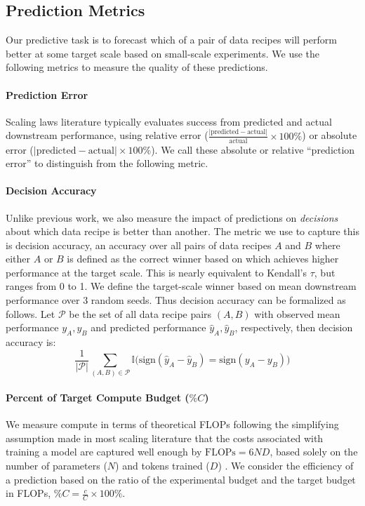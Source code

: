 \documentclass{article}
\theoremstyle{plain}
\theoremstyle{definition}
\theoremstyle{remark}
\newcommand{\numTargetSeeds}{3}
\newcommand{\percentTargetCompute}{$\%C$}
\newcommand{\twoClass}{decision accuracy}
\newcommand{\predictionError}{prediction error}
\begin{document}
\subsection{Prediction Metrics}
\label{sec:pred_metrics}
Our predictive task is to forecast which of a pair of data recipes will perform better at some target scale based on small-scale experiments. We use the following metrics to measure the quality of these predictions.

\paragraph{Prediction Error} Scaling laws literature \citep{bhagia2024establishingtaskscalinglaws, gadre2024languagemodelsscalereliably} typically evaluates success from predicted and actual downstream performance, using relative error ($\frac{\lvert \text{predicted} - \text{actual} \rvert}{\text{actual}} \times 100\%$) or absolute error ($\lvert \text{predicted} - \text{actual} \rvert\times 100\%$). We call these absolute or relative ``\predictionError{}'' to distinguish from the following metric.

\label{sec:2-class}
\paragraph{Decision Accuracy} 
Unlike previous work, we also measure the impact of predictions on \textit{decisions} about which data recipe is better than another. The metric we use to capture this is \twoClass{}, an accuracy over all pairs of data recipes $A$ and $B$ where either $A$ or $B$ is defined as the correct winner based on which achieves higher performance at the target scale. This is nearly equivalent to Kendall's $\tau$, but ranges from 0 to 1. We define the target-scale winner based on mean downstream performance over \numTargetSeeds{} random seeds.
Thus \twoClass{}  can be formalized as follows.  Let   \(\mathcal{P}\) be the set of all data recipe pairs \((A, B)\) with observed mean performance \(y_A, y_B\) and predicted performance \(\hat{y}_A, \hat{y}_B\), respectively, then \twoClass{} is:
\begin{equation}
\textstyle \frac{1}{\lvert \mathcal{P}\rvert} \sum_{(A, B) \in \mathcal{P}} \mathbb{I}\big(\text{sign}(\hat{y}_A - \hat{y}_B) = \text{sign}(y_A - y_B)\big)
\end{equation} 

\paragraph{Percent of Target Compute Budget (\percentTargetCompute{})} We measure compute in terms of theoretical FLOPs following the simplifying assumption made in most scaling literature that the costs associated with training a model are captured well enough by $\text{FLOPs}=6ND$, based solely on the number of parameters ($N$) and tokens trained ($D$) \citep{kaplan2020scalinglawsneurallanguage}. We consider the efficiency of a prediction based on the ratio of the experimental budget and the target budget in FLOPs, $\text{\percentTargetCompute{}}=\frac{c}{C} \times 100\%$. 
\end{document}
